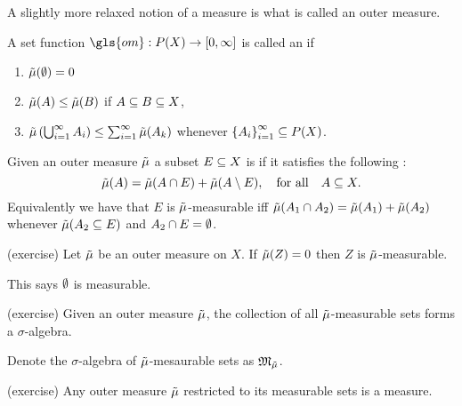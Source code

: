 A slightly more relaxed notion of a measure is what is called an outer measure.

\begin{defn}
  A set function $\gls{om}:P(X)\to [0,\infty]$ is called an  if
  \begin{enumerate}
    \item $\tilde{\mu}(\emptyset)=0$
    \item $\tilde{\mu}(A) \le \tilde{\mu}(B)$ if $A\subseteq B\subseteq X$,
    \item  $\tilde{\mu}\left( \bigcup_{i=1}^\infty A_i \right)\le
      \sum_{i=1}^\infty \tilde{\mu}(A_k)$ whenever $\left\{ A_i
      \right\}_{i=1}^\infty\subseteq P(X)$.
  \end{enumerate}
\end{defn}

\begin{defn}
  Given an outer measure $\tilde{\mu}$ a subset $E\subseteq X$ is
   if it satisfies the following
  :
  \begin{equation}
   \tilde{\mu}(A) = \tilde{\mu}(A\cap E)+\tilde{\mu}(A\setminus E), \quad\text{for all}\quad A\subseteq X.
  \end{equation}
  Equivalently we have that $E$ is $\tilde{\mu}$-measurable iff
  $\tilde{\mu}(A_1\cap A_2) = \tilde{\mu}(A_1)+\tilde{\mu}(A_2)$ whenever $\tilde{\mu}(A_2\subseteq E)$ and
  $A_2\cap E=\emptyset$.
\end{defn}

\begin{prop}(exercise)
  Let $\tilde{\mu}$ be an outer measure on $X$. If $\tilde{\mu}(Z) = 0$ then $Z$ is
  $\tilde{\mu}$-measurable.
\end{prop}

\begin{note}
  This says $\emptyset$ is measurable.
\end{note}

\begin{prop}
  (exercise) Given an outer measure $\tilde{\mu}$, the collection of all
  $\tilde{\mu}$-measurable sets forms a $\sigma$-algebra.
\end{prop}

\begin{defn}
  Denote the $\sigma$-algebra of $\tilde{\mu}$-mesaurable sets as
  $\mathfrak{M}_{\tilde{\mu}}$.

\end{defn}

\begin{prop}(exercise)
  Any outer measure $\tilde{\mu}$ restricted to its measurable sets is a
  measure.
\end{prop}

